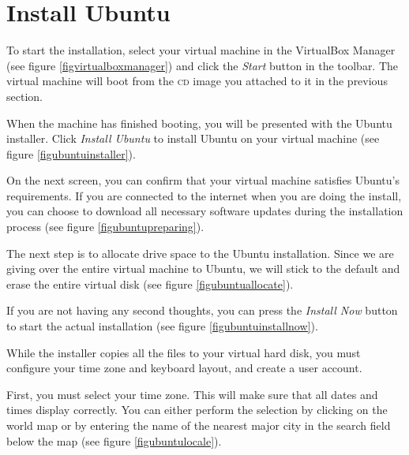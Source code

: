 \documentclass[draft,ebook,10pt,twoside,openright]{memoir}
\begin{document}
\section{Install Ubuntu} \label{secinstallubuntu}

To start the installation, select your virtual machine in the VirtualBox Manager (see figure \ref{figvirtualboxmanager}) and click the \emph{Start} button in the toolbar. The virtual machine will boot from the \textsc{cd} image you attached to it in the previous section.


When the machine has finished booting, you will be presented with the Ubuntu installer. Click \emph{Install Ubuntu} to install Ubuntu on your virtual machine (see figure \ref{figubuntuinstaller}).


On the next screen, you can confirm that your virtual machine satisfies Ubuntu's requirements. If you are connected to the internet when you are doing the install, you can choose to download all necessary software updates during the installation process (see figure \ref{figubuntupreparing}).


The next step is to allocate drive space to the Ubuntu installation. Since we are giving over the entire virtual machine to Ubuntu, we will stick to the default and erase the entire virtual disk (see figure \ref{figubuntuallocate}).


If you are not having any second thoughts, you can press the \emph{Install Now} button to start the actual installation (see figure \ref{figubuntuinstallnow}).


While the installer copies all the files to your virtual hard disk, you must configure your time zone and keyboard layout, and create a user account.

First, you must select your time zone. This will make sure that all dates and times display correctly. You can either perform the selection by clicking on the world map or by entering the name of the nearest major city in the search field below the map (see figure \ref{figubuntulocale}).
\end{document}
